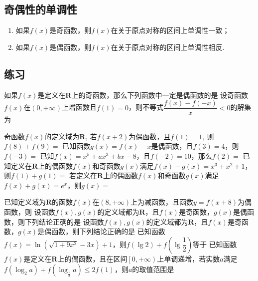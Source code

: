\documentclass{BHCexam}
\begin{document}
\subsection{奇偶性的单调性}
\begin{enumerate}[1)]
\item 如果$f(x)$是奇函数，则$f(x)$在关于原点对称的区间上单调性一致；
\item 如果$f(x)$是偶函数，则$f(x)$在关于原点对称的区间上单调性相反.
\end{enumerate}
\newpage
\subsection*{练习}
\begin{questions}
\qs 如果$f(x)$是定义在$\mathbf{R}$上的奇函数，那么下列函数中一定是偶函数的是\xx
{}
\qs 设奇函数$f(x)$在$ \left(0,+\infty\right) $上增函数且$ f(1)=0 $，则不等式$ \dfrac{f(x)-f(-x)}{x}<0 $的解集为\xx
{}

\qs 奇函数$f(x)$的定义域为$ \mathbf{R} ,~$若$ f(x+2) $为偶函数，且$ f(1)=1,~ $则 $f(8)+f(9)=$\xx
{}
\qs 已知函数$g(x)=f(x)-x$是偶函数，且$ f(3)=4 $，则$ f(-3)= $\xx
{}
\qs 已知$f(x)=x^5+ax^3+bx-8$，且$f(-2)=10$，那么$f(2)=$\xx
{}
\qs 已知定义在$ \mathbf{R} $上的偶函数$f(x)$和奇函数$g(x)$满足$ f(x)-g(x)=x^3+x^2+1 $，则$ f(1)+g(1)= $\xx
{}
\qs 若定义在$\mathbf{R}$上的偶函数$f(x)$和奇函数$g(x)$满足$ f(x)+g(x)=e^x $，则$ g(x)= $\xx
{}

\qs 已知定义域为$\mathbf{R} $的函数$f(x)$在$ \left(8,+\infty\right) $上为减函数，且函数$y=f(x+8)$为偶函数，则\xx
{}
\question
设函数$f(x),g(x)$的定义域都为$\mathbf{R}$，且$f(x)$是奇函数，$g(x)$是偶函数，则下列结论正确的是\xx
{}
\question
设函数$f(x),g(x)$的定义域都为$\mathbf{R}$，且$f(x)$是奇函数，$g(x)$是偶函数，则下列结论正确的是\xx
{}
\qs 已知函数$f(x)=\ln \left(\sqrt{1+9x^2}-3x\right)+1$，则$ f(\lg2)+f\left(\lg\dfrac{1}{2}\right) $等于\xx
{}
\qs 已知函数$f(x)$是定义在$ \mathbf{R} $上的偶函数，且在区间$ \left[0,+\infty\right) $上单调递增，若实数$ a $满足$ f(\log_2a) +f(\log_\frac{1}{2}a)\le 2f(1)$，则$ a $的取值范围是\xx
\onech{$ \left[1,2\right]$}{$ \left(0,\dfrac{1}{2}\right]$}{$ \left[\dfrac{1}{2},2\right]$}{$ \left(0,2\right]$}


\end{questions}
\end{document}
